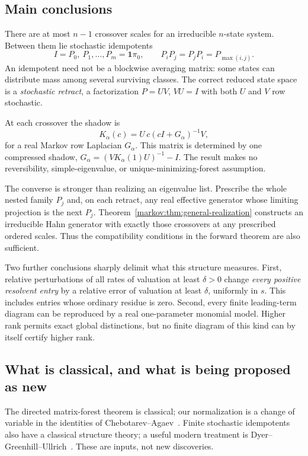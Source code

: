 \documentclass[11pt]{article}
\numberwithin{equation}{section}
\theoremstyle{definition}
\theoremstyle{remark}
\newcommand{\one}{\mathbf 1}
\begin{document}
\subsection{Main conclusions}

There are at most $n-1$ crossover scales for an irreducible $n$-state system.
Between them lie stochastic idempotents
\[
 I=P_0,\ P_1,\ldots,P_m=\one\pi_0,
 \qquad P_iP_j=P_jP_i=P_{\max(i,j)}.
\]
An idempotent need not be a blockwise averaging matrix: some states can distribute
mass among several surviving classes. The correct reduced state space is a
\emph{stochastic retract}, a factorization $P=UV$, $VU=I$ with both $U$ and $V$
row stochastic.

At each crossover the shadow is
\[
 K_\alpha(c)=U\,c(cI+G_\alpha)^{-1}V,
\]
for a real Markov row Laplacian $G_\alpha$. This matrix is determined by one
compressed shadow, $G_\alpha=(VK_\alpha(1)U)^{-1}-I$. The result makes no
reversibility, simple-eigenvalue, or unique-minimizing-forest assumption.

The converse is stronger than realizing an eigenvalue list. Prescribe the whole
nested family $P_j$ and, on each retract, any real effective generator whose
limiting projection is the next $P_j$. Theorem~\ref{markov:thm:general-realization}
constructs an irreducible Hahn generator with exactly those crossovers at any
prescribed ordered scales. Thus the compatibility conditions in the forward
theorem are also sufficient.

Two further conclusions sharply delimit what this structure measures.
First, relative perturbations of all rates of valuation at least $\delta>0$
change \emph{every positive resolvent entry} by a relative error of valuation at
least $\delta$, uniformly in $s$. This includes entries whose ordinary residue is
zero. Second, every finite leading-term diagram can be reproduced by a real
one-parameter monomial model. Higher rank permits exact global distinctions, but
no finite diagram of this kind can by itself certify higher rank.

\subsection{What is classical, and what is being proposed as new}

The directed matrix-forest theorem is classical; our normalization is a change of
variable in the identities of Chebotarev--Agaev~\cite{CA}. Finite stochastic
idempotents also have a classical structure theory; a useful modern treatment is
Dyer--Greenhill--Ullrich~\cite{DGU}. These are inputs, not new discoveries.
\end{document}
